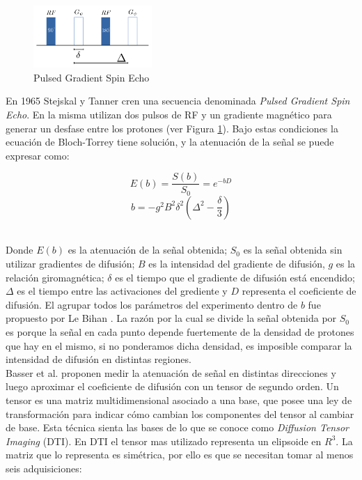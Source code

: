 \begin{figure}
    \begin{center}
        \vspace{-1cm}
        \includegraphics[width=0.4\textwidth]{img/fgp.png}
        \caption{Pulsed Gradient Spin Echo}
        \label{fig:fgp}
    \end{center}
\end{figure}  

En 1965 Stejskal y Tanner \cite{Stejskal1965} cren una secuencia denominada 
\textit{Pulsed Gradient Spin Echo}. En la misma utilizan dos pulsos de RF y 
un gradiente magn\'etico para generar un desfase entre los protones (ver Figura
\ref{fig:fgp}). Bajo estas condiciones la ecuaci\'on de Bloch-Torrey tiene
soluci\'on, y la atenuaci\'on de la se\~nal se puede expresar como:

\vspace{0.3cm}

$$ E(b) = \frac{S(b)}{S_0} = e^{-b D} $$
$$ b = -g^2 B^2 \delta^2 (\Delta^2 - \frac{\delta}{3}) $$ \\

\vspace{0.1cm}
 
Donde $E(b)$ es la atenuaci\'on de la se\~nal obtenida; $S_0$ es la se\~nal obtenida
sin utilizar gradientes de difusi\'on; $B$ es la intensidad del gradiente de
difusi\'on, $g$ es la relaci\'on giromagn\'etica;  $\delta$ es el tiempo que el
gradiente de difusi\'on est\'a encendido; $\Delta$ es el tiempo entre las 
activaciones del grediente y $D$ representa el coeficiente de difusi\'on.
El agrupar todos los par\'ametros del experimento dentro de $b$ fue propuesto por
Le Bihan \cite{LEBIHAN}.
La raz\'on por la cual se divide la se\~nal obtenida por $S_0$ es porque la
se\~nal en cada punto depende fuertemente de la densidad de protones que hay
en el mismo, si no ponderamos dicha densidad, es imposible comparar la intensidad
de difusi\'on en distintas regiones. \\

Basser et al. \cite{Basser1994} proponen medir la atenuaci\'on de se\~nal en
distintas direcciones y luego aproximar el coeficiente de difusi\'on con un 
tensor de segundo orden. Un tensor es una matriz multidimensional asociado a una
base, que posee una ley de transformaci\'on  para indicar  c\'omo cambian los 
componentes del tensor al cambiar de base. Esta t\'ecnica sienta las bases de lo
que se conoce como \textit{Diffusion Tensor Imaging} (DTI). En DTI el tensor 
mas utilizado representa un elipsoide en $R^3$. La matriz que lo representa
es  sim\'etrica, por ello es que se necesitan tomar al menos seis adquisiciones: 

